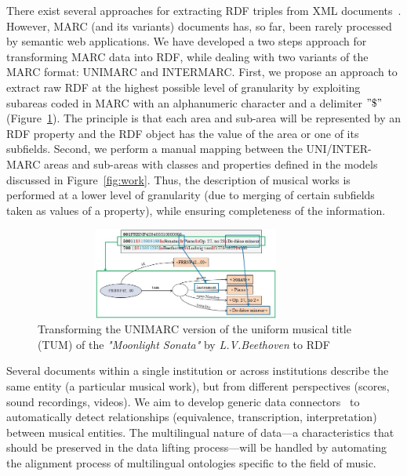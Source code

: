 \documentclass{llncs}
\begin{document}
There exist several approaches for extracting RDF triples from XML documents~\cite{xml2rdf1}. However, MARC (and its variants) documents has, so far, been rarely processed by semantic web applications. We have developed a two steps approach for transforming MARC data into RDF, while dealing with two variants of the MARC format: UNIMARC and INTERMARC. First, we propose an approach to extract raw RDF at the highest possible level of granularity by exploiting subareas coded in MARC with an alphanumeric character and a delimiter $"\$"$ (Figure~\ref{fig:fig1}). The principle is that each area and sub-area will be represented by an RDF property and the RDF object has the value of the area or one of its subfields. Second, we perform a manual mapping between the UNI/INTER-MARC areas and sub-areas with classes and properties defined in the models discussed in Figure~\ref{fig:work}. Thus, the description of musical works is performed at a lower level of granularity (due to merging of certain subfields taken as values of a property), while ensuring completeness of the information.
\begin{figure}[htbp]
  \centering
  \includegraphics[width=10cm, height=3cm]{img/sonata.jpg}
  \caption{Transforming the UNIMARC version of the uniform musical title (TUM) of the {\it "Moonlight Sonata"} by {\it L.V.Beethoven} to RDF}
  \label{fig:fig1}
\end{figure}

Several documents within a single institution or across institutions describe the same entity (a particular musical work), but from different perspectives (scores, sound recordings, videos). We aim to develop generic data connectors~\cite{scharffe2012enabling} to automatically detect relationships (equivalence, transcription, interpretation) between musical entities. The multilingual nature of data---a characteristics that should be preserved in the data lifting process---will be handled by automating the alignment process of multilingual ontologies specific to the field of music.

\end{document}
